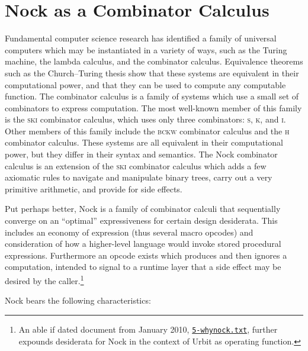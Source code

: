 \documentclass[twoside]{article}
\begin{document}
\section{Nock as a Combinator Calculus}

Fundamental computer science research has identified a family of universal computers which may be instantiated in a variety of ways, such as the Turing machine, the lambda calculus, and the combinator calculus.  Equivalence theorems such as the Church–Turing thesis show that these systems are equivalent in their computational power, and that they can be used to compute any computable function.  The combinator calculus is a family of systems which use a small set of combinators to express computation.  The most well-known member of this family is the \textsc{ski} combinator calculus, which uses only three combinators: \textsc{s}, \textsc{k}, and \textsc{i}.  Other members of this family include the \textsc{bckw} combinator calculus and the \textsc{h} combinator calculus.  These systems are all equivalent in their computational power, but they differ in their syntax and semantics.  The Nock combinator calculus is an extension of the \textsc{ski} combinator calculus which adds a few axiomatic rules to navigate and manipulate binary trees, carry out a very primitive arithmetic, and provide for side effects.

Put perhaps better, Nock is a family of combinator calculi that sequentially converge on an ``optimal'' expressiveness for certain design desiderata.  This includes an economy of expression (thus several macro opcodes) and consideration of how a higher-level language would invoke stored procedural expressions.  Furthermore an opcode exists which produces and then ignores a computation, intended to signal to a runtime layer that a side effect may be desired by the caller.\footnote{An able if dated document from January 2010, \href{https://github.com/cgyarvin/urbit/blob/1bc9086a3fd62594e8bd631744cb9bf804f6a43b/Spec/urbit/5-whynock.txt}{\texttt{5-whynock.txt}}, further expounds desiderata for Nock in the context of Urbit as operating function.}

Nock bears the following characteristics:
\end{document}
